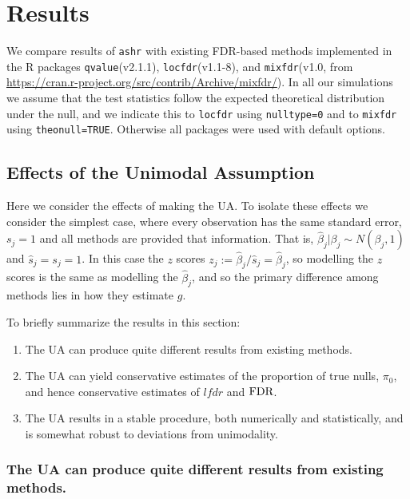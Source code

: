 \documentclass[11pt]{article}
\def\lfdr{\textit{lfdr}}
\def\bhat{\hat{\beta}}
\def\shat{\hat{s}}
\def\qvalue{{\tt qvalue}\xspace}
\def\locfdr{{\tt locfdr}\xspace}
\def\mixfdr{{\tt mixfdr}\xspace}
\def\ashr{{\tt ashr}\xspace}
\begin{document}
\section*{Results}

We compare results of \ashr with existing FDR-based methods implemented
in the R packages \qvalue (v2.1.1), \locfdr (v1.1-8), and \mixfdr (v1.0, from \url{https://cran.r-project.org/src/contrib/Archive/mixfdr/}).
In all our simulations we assume that the test statistics follow the expected theoretical distribution under the null, and we indicate this
to \locfdr using {\tt nulltype=0} and to \mixfdr using {\tt theonull=TRUE}. Otherwise all packages were used with default options.


\subsection*{Effects of the Unimodal Assumption}

Here we consider the effects of making the UA. 
To isolate these effects we consider the simplest case, where every observation has the same
standard error, $s_j=1$ and all methods are provided that information. That is,
$\bhat_j | \beta_j \sim N(\beta_j,1)$ and $\shat_j=s_j=1$. In this case the $z$ scores $z_j:=\bhat_j/\shat_j=\bhat_j$, so modelling the $z$ scores is the same as modelling the $\bhat_j$, and so the primary difference among methods lies in how they estimate $g$.

To briefly summarize the results in this section:
\begin{enumerate}
\item The UA can produce quite different results from existing methods.
\item The UA can yield conservative estimates of the proportion of true nulls, $\pi_0$, and hence conservative estimates of $\lfdr$ and $\text{FDR}$.
\item The UA results in a stable procedure, both numerically and statistically, and is somewhat robust to deviations from unimodality.
\end{enumerate}

\subsubsection*{The UA can produce quite different results from existing methods.}
\end{document}
